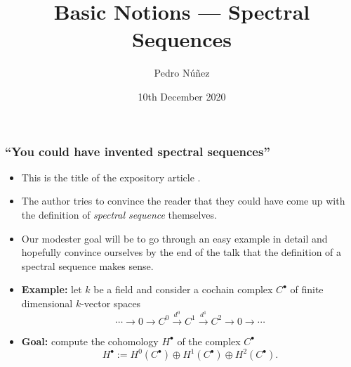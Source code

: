 \documentclass[notheorems, hyperref={backref}]{beamer}
\title[Basic Notions --- Spectral Sequences]{Basic Notions --- Spectral Sequences}
\author{Pedro Núñez}
\institute{University of Freiburg}
\date{10th December 2020}
\theoremstyle{darkgreentheorem}
\theoremstyle{darkbluedefinition}
\theoremstyle{darkredexample}
\theoremstyle{remark}
\newcommand{\op}{\oplus}
\begin{document}
 
\frame{\titlepage}

\begin{frame}
    \frametitle{``You could have invented spectral sequences''}
    \begin{itemize}
	\item This is the title of the expository article \cite{cho06}.
	    \pause
	\item The author tries to convince the reader that they could have come up with the definition of \textit{spectral sequence} themselves.
	    \pause
	\item Our modester goal will be to go through an easy example in detail and hopefully convince ourselves by the end of the talk that the definition of a spectral sequence makes sense.
	    \pause
	\item \textbf{Example:} let $k$ be a field and consider a cochain complex $C^{\bullet}$ of finite dimensional $k$-vector spaces
	    \[ \cdots \to 0\to C^{0}\xrightarrow{d^{0}} C^{1}\xrightarrow{d^{1}} C^{2}\to 0 \to \cdots \]
	    \pause
	    \vspace{-5mm}
	\item \textbf{Goal:} compute the cohomology $H^{\bullet}$ of the complex $C^{\bullet}$
	    \[ H^{\bullet}:=H^{0}(C^{\bullet})\op H^{1}(C^{\bullet})\op H^{2}(C^{\bullet}). \]
    \end{itemize}
\end{frame}
\end{document}
